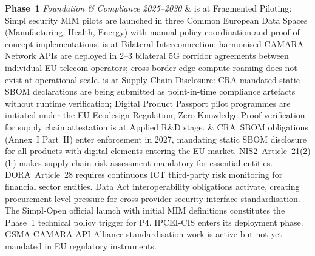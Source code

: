 \begin{landscape}
\begin{longtable}
\textbf{Phase~1}
\newline\textit{Foundation \&}
\newline\textit{Compliance}
\newline\textit{2025--2030}
\newline{}
\newline{}
\newline{}
&
 is at Fragmented Piloting: Simpl security MIM pilots are
launched in three Common European Data Spaces (Manufacturing, Health,
Energy) with manual policy coordination and proof-of-concept
implementations.  is at Bilateral Interconnection: harmonised
CAMARA Network APIs are deployed in 2--3 bilateral 5G corridor agreements
between individual EU telecom operators; cross-border edge compute
roaming does not exist at operational scale.  is at Supply
Chain Disclosure: CRA-mandated static SBOM declarations are being
submitted as point-in-time compliance artefacts without runtime
verification; Digital Product Passport pilot programmes are initiated
under the EU Ecodesign Regulation; Zero-Knowledge Proof verification
for supply chain attestation is at Applied R\&D stage.
&
CRA~SBOM obligations (Annex~I Part~II) enter enforcement in 2027,
mandating static SBOM disclosure for all products with digital elements
entering the EU market. NIS2~Article~21(2)(h) makes supply chain risk
assessment mandatory for essential entities. DORA~Article~28 requires
continuous ICT third-party risk monitoring for financial sector entities.
Data Act interoperability obligations activate, creating procurement-level
pressure for cross-provider security interface standardisation. The
Simpl-Open official launch with initial MIM definitions constitutes the
Phase~1 technical policy trigger for P4. IPCEI-CIS enters its
deployment phase. GSMA CAMARA API Alliance standardisation work is
active but not yet mandated in EU regulatory instruments.
\end{longtable}
\end{landscape}
